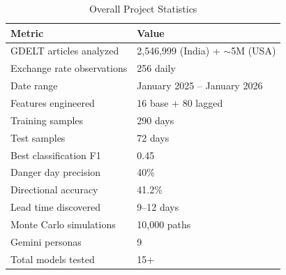 \documentclass[11pt]{article}
\begin{document}
\begin{table}[H]
\centering
\small
\caption{Overall Project Statistics}
\begin{tabular}{ll}
\toprule
\textbf{Metric} & \textbf{Value} \\
\midrule
GDELT articles analyzed & 2,546,999 (India) + $\sim$5M (USA) \\
Exchange rate observations & 256 daily \\
Date range & January 2025 -- January 2026 \\
Features engineered & 16 base + 80 lagged \\
Training samples & 290 days \\
Test samples & 72 days \\
Best classification F1 & 0.45 \\
Danger day precision & 40\% \\
Directional accuracy & 41.2\% \\
Lead time discovered & 9--12 days \\
Monte Carlo simulations & 10,000 paths \\
Gemini personas & 9 \\
Total models tested & 15+ \\
\bottomrule
\end{tabular}
\end{table}
\end{document}
